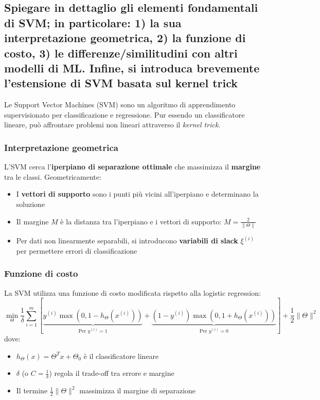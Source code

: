 \documentclass[10pt,oneside,a4paper]{article}
\begin{document}
	\subsection{Spiegare in dettaglio gli elementi fondamentali di SVM; in particolare:
			1) la sua interpretazione geometrica, 2) la funzione di costo, 3) le differenze/similitudini con altri modelli di ML.
			Infine, si introduca brevemente l’estensione di SVM basata sul kernel trick}
	Le Support Vector Machines (SVM) sono un algoritmo di apprendimento supervisionato per classificazione e regressione. Pur essendo un classificatore lineare, può affrontare problemi non lineari attraverso il \textit{kernel trick}.
	
	\subsubsection{Interpretazione geometrica}
	L'SVM cerca l'\textbf{iperpiano di separazione ottimale} che massimizza il \textbf{margine} tra le classi. Geometricamente:
	\begin{itemize}
		\item I \textbf{vettori di supporto} sono i punti più vicini all'iperpiano e determinano la soluzione
		\item Il margine $M$ è la distanza tra l'iperpiano e i vettori di supporto: $M = \frac{2}{\|\Theta\|}$
		\item Per dati non linearmente separabili, si introducono \textbf{variabili di slack} $\xi^{(i)}$ per permettere errori di classificazione
	\end{itemize}
	
	\subsubsection{Funzione di costo}
	La SVM utilizza una funzione di costo modificata rispetto alla logistic regression:
	\[
	\min_{\Theta} \frac{1}{\delta} \sum_{i=1}^m \left[
	\underbrace{y^{(i)} \max(0, 1 - h_\Theta(x^{(i)}))}_{\text{Per } y^{(i)}=1} + 
	\underbrace{(1-y^{(i)}) \max(0, 1 + h_\Theta(x^{(i)}))}_{\text{Per } y^{(i)}=0}
	\right] + 
	\frac{1}{2} \|\Theta\|^2
	\]
	dove:
	\begin{itemize}
		\item \( h_\Theta(x) = \Theta^T x + \Theta_0 \) è il classificatore lineare
		\item \( \delta \) (o \( C = \frac{1}{\delta} \)) regola il trade-off tra errore e margine
		\item Il termine \( \frac{1}{2}\|\Theta\|^2 \) massimizza il margine di separazione
	\end{itemize}
	
\end{document}
